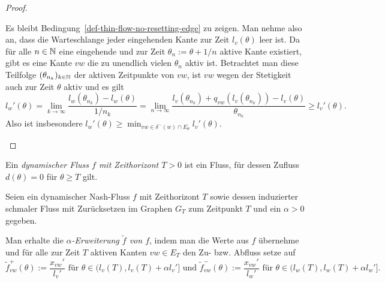 \begin{proof}
\begin{description}[leftmargin=0cm, topsep=0cm, itemindent=0.5cm]
		Es bleibt Bedingung~\ref{def-thin-flow-no-resetting-edge} zu zeigen.
		Man nehme also an, dass die Warteschlange jeder eingehenden Kante zur Zeit $l_v(\theta)$ leer ist.
		Da für alle $n\in\mathbb{N}$ eine eingehende und zur Zeit $\theta_n := \theta + 1/n$ aktive Kante existiert, gibt es eine Kante $vw$ die zu unendlich vielen $\theta_n$ aktiv ist.
		Betrachtet man diese Teilfolge $(\theta_{n_k})_{k\in\mathbb{N}}$ der aktiven Zeitpunkte von $vw$, ist $vw$ wegen der Stetigkeit auch zur Zeit $\theta$ aktiv und es gilt 
		$$l_w'(\theta) = \lim_{k\to\infty} \frac{l_w(\theta_{n_k})- l_w(\theta)}{1/n_k} = \lim_{n\to\infty} \frac{ l_v(\theta_{n_k}) + q_{vw}(l_v(\theta_{n_k})) - l_v(\theta) }{\theta_{n_k}} \geq l_v'(\theta).$$
	Also ist insbesondere $l_w'(\theta) \geq \min_{vw\in \delta^-(w)\cap E_\theta} l_v'(\theta)$.
	\end{description}
\vspace{-1.2 \baselineskip}\end{proof}

\begin{definition}
	Ein \emph{dynamischer Fluss $f$ mit Zeithorizont $T>0$} ist ein Fluss, für dessen Zufluss $d(\theta)= 0$ für $\theta\geq T$ gilt.
\end{definition}

\begin{definition}
	Seien ein dynamischer Nash-Fluss $f$ mit Zeithorizont $T$ sowie dessen induzierter schmaler Fluss mit Zurücksetzen im Graphen $G_T$ zum Zeitpunkt $T$ und ein $\alpha > 0$ gegeben.
	
	
	Man erhalte die \emph{$\alpha$-Erweiterung $\tilde{f}$ von $f$}, indem man die Werte aus $f$ übernehme und für alle zur Zeit $T$ aktiven Kanten $vw\in E_T$ den Zu- bzw. Abfluss setze auf
	$$\tilde{f}_{vw}^+(\theta):= \frac{x_{vw}'}{l_v'} \text{ für $\theta\in (l_v(T), l_v(T)+\alpha l_v']$ und } \tilde{f}_{vw}^-(\theta):=\frac{x_{vw}'}{l_w'} \text{ für $\theta\in (l_w(T), l_w(T)+\alpha l_w']$.}$$
\end{definition}

